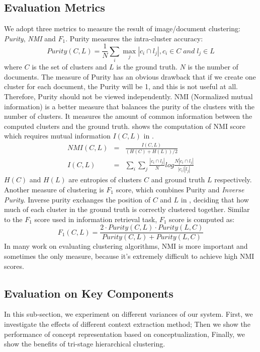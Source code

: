 \subsection{Evaluation Metrics}
We adopt three metrics to measure the result of image/document clustering:
\emph{Purity}, \emph{NMI} and \emph{$F_1$}.
Purity measures the intra-cluster accuracy:
\begin{equation}
\label{equ:purity}
Purity(C,L)=\frac{1}{N}\sum_i{\max_j{|c_i\cap l_j|}}, c_i\in C\;and\;l_j\in L
\end{equation}
where $C$ is the set of clusters and $L$ is the ground truth. $N$ is
the number of documents. The measure of Purity has an obvious drawback
that if we create one cluster for each document, the Purity will be 1, and
this is not useful at all. Therefore, Purity should not be viewed independently.
NMI (Normalized mutual information) is a better measure that
balances the purity of the clusters with the number of clusters.
It measures the amount of common information between the computed clusters and
the ground truth.
 shows the computation of NMI score which requires
mutual information $I(C,L)$ in .
\begin{eqnarray}
NMI(C,L)&=&\frac{I(C,L)}{(H(C)+H(L))/2}
\label{nmi}\\
I(C,L)&=&\sum_i{\sum_j{\frac{|c_i\cap l_j|}{N}log\frac{N|c_i\cap l_j|}{|c_i||l_j|}}}
\label{mi}
\end{eqnarray}
$H(C)$ and $H(L)$ are entropies of clusters $C$ and ground truth $L$ respectively.
Another measure of clustering is $F_1$ score,
which combines Purity and \emph{Inverse Purity}.
Inverse purity exchanges the position of $C$ and $L$ in ,
deciding that how much of each cluster in the ground truth is correctly clustered together.
Similar to the
$F_1$ score used in information retrieval task, $F_1$ score is computed as:
\begin{equation}
F_1(C,L)=\frac{2\cdot Purity(C,L)\cdot Purity(L,C)}{Purity(C,L)+Purity(L,C)}
\end{equation}
In many work on evaluating clustering algorithms, NMI
is more important and sometimes the only measure, because it's extremely
difficult to achieve high NMI scores.



\subsection{Evaluation on Key Components}
In this sub-section, we experiment on different variances of our
system. First, we investigate the effects of different context
extraction method; Then we show the performance of concept
representation based on conceptualization, Finally, we show the benefits of
tri-stage hierarchical clustering.

